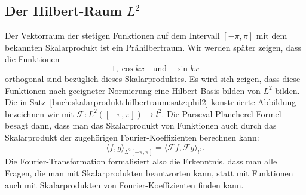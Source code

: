 %
%
\subsection{Der Hilbert-Raum $L^2$}
Der Vektorraum der stetigen Funktionen auf dem Intervall $[-\pi,\pi]$
mit dem bekannten Skalarprodukt ist ein Prähilbertraum.
Wir werden später zeigen, dass die Funktionen
\[
1, \cos kx \quad\text{und}\quad \sin kx
\]
orthogonal sind bezüglich dieses Skalarproduktes.
Es wird sich zeigen, dass diese Funktionen nach geeigneter Normierung
eine Hilbert-Basis bilden von $L^2$ bilden.
Die in Satz~\ref{buch:skalarprodukt:hilbertraum:satz:phil2}
konstruierte Abbildung bezeichnen wir mit $\mathscr{F}:L^2([-\pi,\pi])\to l^2$.
Die Parseval-Plancherel-Formel besagt dann, dass man das Skalarprodukt
von Funktionen auch durch das Skalarprodukt der zugehörigen
Fourier-Koeffizienten berechnen kann:
\[
\langle f,g\rangle_{L^2{[-\pi,\pi]}}
=
\langle \mathscr{F}f,\mathscr{F}g\rangle_{l^2}.
\]
Die Fourier-Transformation formalisiert also die Erkenntnis, dass
man alle Fragen, die man mit Skalarprodukten beantworten kann, statt
mit Funktionen auch mit Skalarprodukten von Fourier-Koeffizienten
finden kann.


